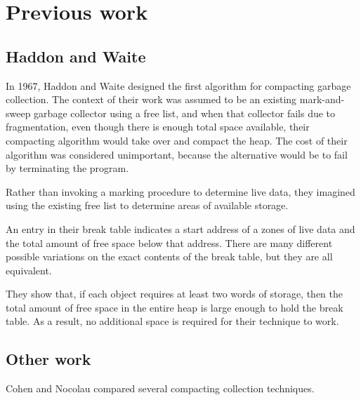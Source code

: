 \section{Previous work}

\subsection{Haddon and Waite}

In 1967, Haddon and Waite \cite{Haddon:1967} designed the first
algorithm for compacting garbage collection.  The context of their
work was assumed to be an existing mark-and-sweep garbage collector
using a free list, and when that collector fails due to fragmentation,
even though there is enough total space available, their compacting
algorithm would take over and compact the heap.  The cost of their
algorithm was considered unimportant, because the alternative would be
to fail by terminating the program.

Rather than invoking a marking procedure to determine live data, they
imagined using the existing free list to determine areas of available
storage. 

An entry in their break table indicates a start address of a zones of
live data and the total amount of free space below that address.
There are many different possible variations on the exact contents of
the break table, but they are all equivalent.

They show that, if each object requires at least two words of storage,
then the total amount of free space in the entire heap is large enough
to hold the break table.  As a result, no additional space is
required for their technique to work.

\subsection{Other work}

Cohen and Nocolau \cite{Cohen:1983:CCA:69575.357226} compared several
compacting collection techniques.
